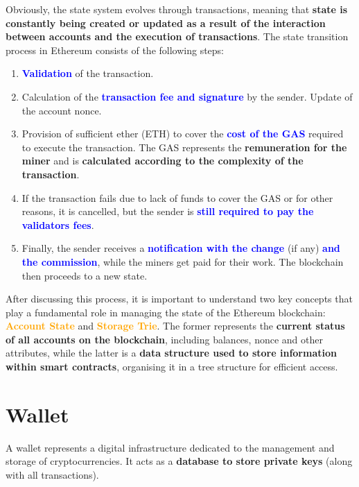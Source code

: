 Obviously, the state system evolves through transactions, meaning that \textbf{state is constantly being created or updated as a result of the interaction between accounts and the execution of transactions}. The state transition process in Ethereum consists of the following steps:

\begin{enumerate}
    \item \textbf{\textcolor{Blue}{Validation}} of the transaction.
    \item Calculation of the \textbf{\textcolor{Blue}{transaction fee and signature}} by the sender. Update of the account nonce.
    \item Provision of sufficient ether (ETH) to cover the \textbf{\textcolor{Blue}{cost of the GAS}} required to execute the transaction. The GAS represents the \textbf{remuneration for the miner} and is \textbf{calculated according to the complexity of the transaction}.
    \item If the transaction fails due to lack of funds to cover the GAS or for other reasons, it is cancelled, but the sender is \textbf{\textcolor{Blue}{still required to pay the validators fees}}.
    \item Finally, the sender receives a \textbf{\textcolor{Blue}{notification with the change}} (if any) \textbf{\textcolor{Blue}{and the commission}}, while the miners get paid for their work. The blockchain then proceeds to a new state.
\end{enumerate}

After discussing this process, it is important to understand two key concepts that play a fundamental role in managing the state of the Ethereum blockchain: \textbf{\textcolor{Orange}{Account State}} and \textbf{\textcolor{Orange}{Storage Trie}}. The former represents the \textbf{current status of all accounts on the blockchain}, including balances, nonce and other attributes, while the latter is a \textbf{data structure used to store information within smart contracts}, organising it in a tree structure for efficient access.



\section{Wallet}

A wallet represents a digital infrastructure dedicated to the management and storage of cryptocurrencies. It acts as a \textbf{database to store private keys} (along with all transactions).

